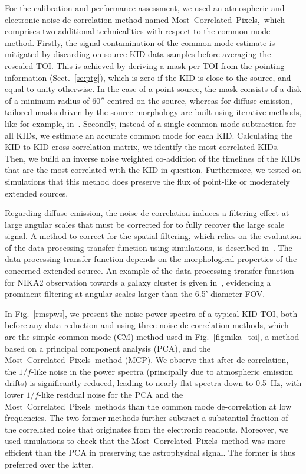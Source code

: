 \documentclass[traditionalabstract]{aa}
\newcommand{\cmoneb}{{Most~Correlated~Pixels}}
\newcommand{\lp}[1]{#1}
\newcommand{\rev}[1]{#1}
\begin{document}
{{\lp For the calibration and performance assessment, we used an
atmospheric and electronic noise
de-correlation method named \cmoneb,\, which comprises two
additional technicalities with respect to the common mode
method.} Firstly, the signal contamination of the common mode estimate
is mitigated by discarding on-source KID data samples before averaging
the rescaled TOI. {\rev This is achieved by deriving a mask per TOI
from the pointing information (Sect.~\ref{se:ptg}), which is zero if
the KID is close to the source, and equal to unity otherwise. In the case of a
point source, the mask consists of a disk of a minimum radius of $60''$
centred on the source, whereas for diffuse emission, tailored masks
driven by the source morphology are built using iterative methods, like
for example, in~\citet{Ruppin2017}.}
Secondly, instead of a single common mode subtraction for
all KIDs, we estimate an accurate common mode for each
KID. Calculating the KID-to-KID cross-correlation matrix, we
identify the most correlated KIDs. Then, we build an
inverse noise weighted co-addition of the timelines of the %
KIDs that are the most correlated with the KID in question. Furthermore, we tested on simulations that this method
does preserve the flux of {\lp point-like or moderately extended
sources.}

{\rev Regarding diffuse emission, the noise de-correlation induces a
filtering effect at large angular scales that must be corrected
for to fully recover the large scale signal. A method to correct for the
spatial filtering, which relies on the evaluation of the data
processing transfer function using simulations, is
described in~\citet{Adam2015}. The data processing transfer function
depends on the morphological properties of the concerned extended source. 
An example of the data processing transfer function for
NIKA2 observation towards a galaxy cluster is given
in~\citet{Ruppin2018}, evidencing a prominent filtering at
angular scales larger than the 6.5' diameter FOV.} 

In Fig.~\ref{rmspws}, we present the noise power spectra of
a typical KID TOI, both before any data reduction and using three noise
de-correlation methods, which are the simple common mode (CM) method
used in Fig.~\ref{fig:nika_toi}, a method based on a principal component
analysis (PCA), and the \cmoneb\ method (MCP). We observe that after de-correlation, the
$1/f$-like noise in the power spectra (principally due to atmospheric
emission drifts)
is significantly reduced, leading to nearly flat spectra down to {\lp
0.5~Hz}, with lower $1/f$-like residual noise for the PCA and
the \cmoneb\ methods than the common mode de-correlation at low
frequencies. {\rev The two former methods further subtract a
substantial fraction of the correlated noise that originates from the
electronic readouts.} {\lp Moreover, we used simulations to check that
the \cmoneb\ method was more efficient than the PCA in preserving the
astrophysical signal. The former is thus preferred over the latter.} 

}
\end{document}
